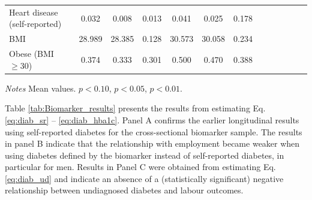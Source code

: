 \documentclass[12pt,english]{article}
\begin{document}
\begin{table}[!ht]
\begin{center}
\begin{adjustbox}{max width=\linewidth}
\begin{threeparttable}
{\begin{tabular}{l*{6}{S S}}
						Heart disease (self-reported)      &     0.032&       0.008&       0.013&       0.041&       0.025&       0.178\\
						BMI     &        28.989&      28.385&       0.128&      30.573&      30.058&       0.234\\
						Obese (BMI $\geq 30$)&         0.374&       0.333&       0.301&       0.500&       0.470&       0.388\\
						\bottomrule
					\end{tabular}
					\begin{tablenotes}
						\item \footnotesize \textit{Notes} Mean values. \sym{*} \(p<0.10\), \sym{**} \(p<0.05\), \sym{***} \(p<0.01\).
					\end{tablenotes}
				}
			\end{threeparttable}
		\end{adjustbox}
	\end{center}
\end{table}


Table \ref{tab:Biomarker_results} presents the results from estimating Eq. \ref{eq:diab_sr} -- \ref{eq:diab_hba1c}. Panel A confirms the earlier longitudinal results using self-reported diabetes for the cross-sectional biomarker sample. The results in panel B indicate that the relationship with employment became weaker when using diabetes defined by the biomarker instead of self-reported diabetes, in particular for men. Results in Panel C were obtained from estimating Eq. \ref{eq:diab_ud} and indicate an absence of a (statistically significant) negative relationship between undiagnosed diabetes and labour outcomes. 
\end{document}
